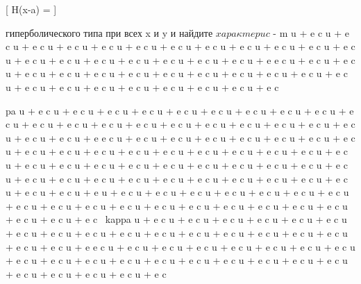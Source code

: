 \documentclass[
  ukrainian,
]{article}
\begin{document}
{[} H(x-a) = {]}

гиперболического типа при всех x и y и найдите
\(x a p a \kappa m e p u c\) - m u + e c \kappa u + e c \kappa u + e c
\kappa u + e c \kappa u + e c \kappa u + e c \kappa u + e c \kappa u + e
c \kappa u + e c \kappa u + e c \kappa u + e c \kappa u + e c \kappa u +
e c \kappa u + e c \kappa u + e c \kappa u + e c \kappa u + e c \kappa u
+ e c \kappa u + e c \kappa u + e e c \kappa u + e c \kappa u + e c
\kappa u + e c \kappa u + e c \kappa u + e c \kappa u + e c \kappa u + e
c \kappa u + e c \kappa u + e c \kappa u + e c \kappa u + e c \kappa u +
e c \kappa u + e c \kappa u + e c \kappa u + e c \kappa u + e c \kappa u
+ e c \kappa u + e c \kappa u + e c \kap u + e c \kap

pa u + e c \kappa u + e c \kappa u + e c \kappa u + e c \kappa u + e c
\kappa u + e c \kappa u + e c \kappa u + e c \kappa u + e c \kappa u + e
c \kappa u + e c \kappa u + e c \kappa u + e c \kappa u + e c \kappa u +
e c \kappa u + e c \kappa u + e c \kappa u + e c \kappa u + e c \kappa u
+ e c \kappa u + e c \kappa u + e c \kappa u + e e c \kappa u + e c
\kappa u + e c \kappa u + e c \kappa u + e c \kappa u + e c \kappa u + e
c \kappa u + e c \kappa u + e c \kappa u + e c \kappa u + e c \kappa u +
e c \kappa u + e c \kappa u + e c \kappa u + e c \kappa u + e c \kappa u
+ e c \kappa u + e c \kappa u + e c \kappa u + e c \kappa u + e c
\kappa u + e c \kappa u + e c \kappa u + e c \kappa u + e c \kappa u + e
c \kappa u + e c \kappa u + e c \kappa u + e c \kappa u + e c \kappa u +
e c \kappa u + e c \kappa u + e c \kappa u + e c \kappa u + e c \kappa u
+ e c \kappa u + e c \kappa u + e c \kappa u + e c \kappa u + e c
\kappa u + e u + e c \kappa u + e c \kappa u + e c \kappa u + e c
\kappa u + e c \kappa u + e c \kappa u + e c \kappa u + e c \kappa u + e
c \kappa u + e c \kappa u + e c \kappa u + e c \kappa u + e c \kappa u +
e c \kappa u + e c \kappa u + e c \kappa u + e c \kappa u + e c \kappa u
+ e c \kappa u + e c ~kappa u + e c \kappa u + e c \kappa u + e c
\kappa u + e c \kappa u + e c \kappa u + e c \kappa u + e c \kappa u + e
c \kappa u + e c \kappa u + e c \kappa u + e c \kappa u + e c \kappa u +
e c \kappa u + e c \kappa u + e c \kappa u + e c \kappa u + e c \kappa u
+ e c \kappa u + e e c \kappa u + e c \kappa u + e c \kappa u + e c
\kappa u + e c \kappa u + e c \kappa u + e c \kappa u + e c \kappa u + e
c \kappa u + e c \kappa u + e c \kappa u + e c \kappa u + e c \kappa u +
e c \kappa u + e c \kappa u + e c \kappa u + e c \kappa u + e c \kappa u
+ e c \kappa u + e c \kappa u + e c \kappa u + e c \kappa u + e c
\end{document}
